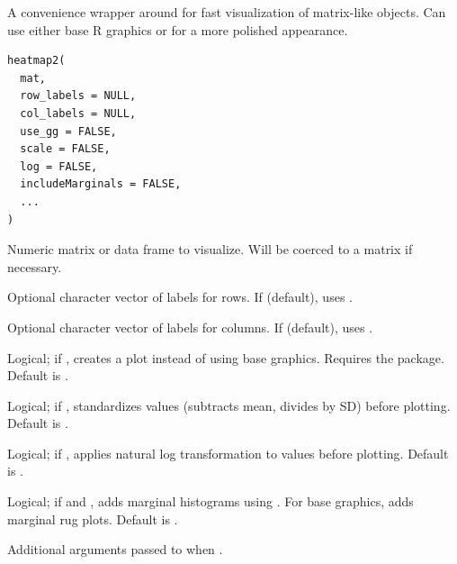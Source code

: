 \documentclass[a4paper]{book}
\begin{document}
%
\begin{Description}
A convenience wrapper around  for fast visualization of
matrix-like objects. Can use either base R graphics or  for a
more polished appearance.
\end{Description}
%
\begin{Usage}
\begin{verbatim}
heatmap2(
  mat,
  row_labels = NULL,
  col_labels = NULL,
  use_gg = FALSE,
  scale = FALSE,
  log = FALSE,
  includeMarginals = FALSE,
  ...
)
\end{verbatim}
\end{Usage}
%
\begin{Arguments}
\begin{ldescription}
\item[\code{mat}] Numeric matrix or data frame to visualize. Will be coerced to a
matrix if necessary.

\item[\code{row\_labels}] Optional character vector of labels for rows. If 
(default), uses .

\item[\code{col\_labels}] Optional character vector of labels for columns. If
 (default), uses .

\item[\code{use\_gg}] Logical; if , creates a  plot instead
of using base graphics. Requires the  package. Default is
.

\item[\code{scale}] Logical; if , standardizes values (subtracts mean,
divides by SD) before plotting. Default is .

\item[\code{log}] Logical; if , applies natural log transformation to
values before plotting. Default is .

\item[\code{includeMarginals}] Logical; if  and ,
adds marginal histograms using . For base graphics, adds
marginal rug plots. Default is .

\item[\code{...}] Additional arguments passed to  when
.
\end{ldescription}
\end{Arguments}
\end{document}
